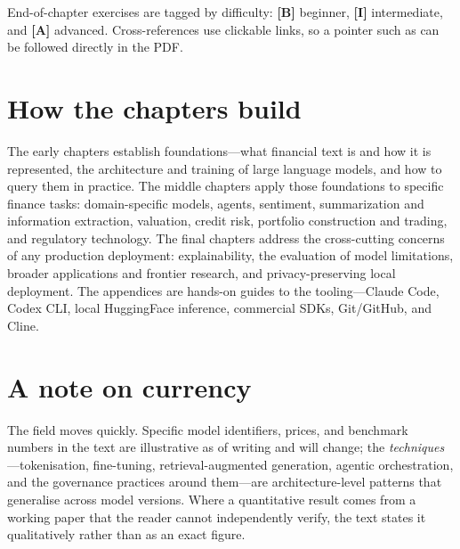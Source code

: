 End-of-chapter exercises are tagged by difficulty: \textbf{[B]} beginner, \textbf{[I]}
intermediate, and \textbf{[A]} advanced. Cross-references use clickable links, so a pointer
such as  can be followed directly in the PDF.

\section*{How the chapters build}

The early chapters establish foundations---what financial text is and how it is
represented, the architecture and training of large language models, and how to query them
in practice. The middle chapters apply those foundations to specific finance tasks:
domain-specific models, agents, sentiment, summarization and information extraction,
valuation, credit risk, portfolio construction and trading, and regulatory technology. The
final chapters address the cross-cutting concerns of any production deployment:
explainability, the evaluation of model limitations, broader applications and frontier
research, and privacy-preserving local deployment. The appendices are hands-on guides to
the tooling---Claude Code, Codex CLI, local HuggingFace inference, commercial SDKs,
Git/GitHub, and Cline.

\section*{A note on currency}

The field moves quickly. Specific model identifiers, prices, and benchmark numbers in the
text are illustrative as of writing and will change; the \emph{techniques}---tokenisation,
fine-tuning, retrieval-augmented generation, agentic orchestration, and the governance
practices around them---are architecture-level patterns that generalise across model
versions. Where a quantitative result comes from a working paper that the reader cannot
independently verify, the text states it qualitatively rather than as an exact figure.
